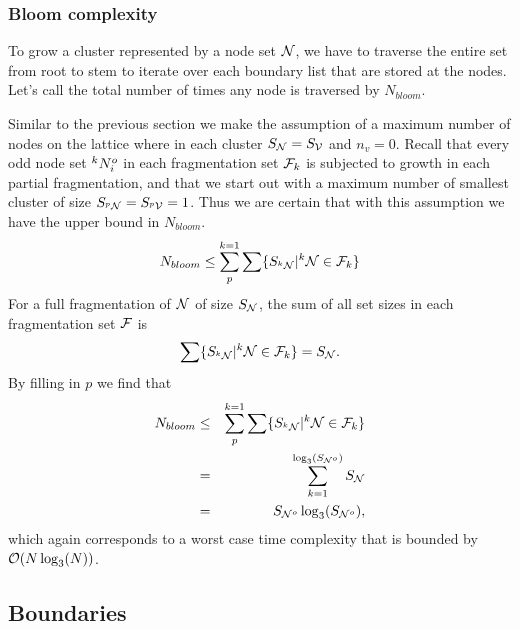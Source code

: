 \subsubsection{Bloom complexity}

To grow a cluster represented by a node set $\mathcal{N}$, we have to traverse the entire set from root to stem to iterate over each boundary list that are stored at the nodes. Let's call the total number of times any node is traversed by  $N_{bloom}$. 

Similar to the previous section we make the assumption of a maximum number of nodes on the lattice where in each cluster $S_{\mathcal{N}} = S_{\mathcal{V}}$ and $n_v = 0$. Recall that every odd node set ${}^{k}N^o_i$ in each fragmentation set $\mathcal{F}_k$ is subjected to growth in each partial fragmentation, and that we start out with a maximum number of smallest cluster of size $S_{{}^{p}\mathcal{N}} = S_{{}^{p}\mathcal{V}} = 1$. Thus we are certain that with this assumption we have the upper bound in $N_{bloom}$.
\begin{equation}\label{eq:nnode}
  N_{bloom} \leq \sum_{p}^{k=1}\sum \{ S_{{}^{k}\mathcal{N}} | {}^{k}\mathcal{N} \in \mathcal{F}_k \}
\end{equation}
For a full fragmentation of $\mathcal{N}$ of size $S_{\mathcal{N}}$, the sum of all set sizes in each fragmentation set $\mathcal{F}$ is
\begin{equation}\label{eq:sumsetsfrag}
  \sum \{S_{{}^{k}\mathcal{N}} | {}^{k}\mathcal{N} \in \mathcal{F}_k \} = S_{\mathcal{N}}.
\end{equation}
By filling in $p$ we find that
\begin{eqnarray}
  \nonumber N_{bloom} &\leq& \sum_{p}^{k=1}\sum \{ S_{{}^{k}\mathcal{N}} | {}^{k}\mathcal{N} \in \mathcal{F}_k \} \\
  \nonumber &=& \sum_{k=1}^{\log_3(S_{\mathcal{N}^o})} S_{\mathcal{N}} \\
   &=& S_{\mathcal{N}^o}\log_3(S_{\mathcal{N}^o}),
\end{eqnarray}
which again corresponds to a worst case time complexity that is bounded by $\mathcal{O}(N\log_3(N))$. 

\subsection{Boundaries}